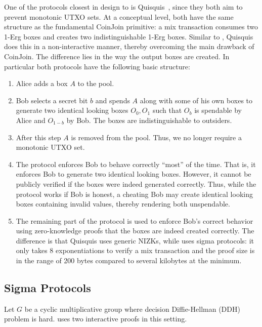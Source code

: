 \documentclass[runningheads]{llncs}
\begin{document}
One of the protocols closest in design to \algname is Quisquis~\cite{quisquis}, since they both aim to prevent monotonic UTXO sets. 
At a conceptual level, both have the same structure as the fundamental CoinJoin primitive: a mix transaction consumes two 1-Erg boxes and creates two indistinguishable
1-Erg boxes. Similar to \algname, Quisquis does this in a non-interactive manner, thereby overcoming the main drawback of CoinJoin. The difference lies in the way 
the output boxes are created. In particular both protocols have the following basic structure:
\begin{enumerate}
    \item Alice adds a box $A$ to the pool.
    \item Bob selects a secret bit $b$ and spends $A$ along with some of his own boxes to generate two identical looking boxes $O_0, O_1$ such that $O_b$ is spendable by Alice and $O_{1-b}$ by Bob. The boxes are indistinguishable to outsiders. 
    \item After this step $A$ is removed from the pool. Thus, we no longer require a monotonic UTXO set. 
    \item The protocol enforces Bob to behave correctly ``most'' of the time. That is, it enforces Bob to generate two identical looking boxes. However, it cannot be publicly verified if the boxes were indeed generated correctly. Thus, while the protocol works if Bob is honest, a cheating Bob may create identical looking boxes containing invalid values, thereby rendering both unspendable. 
    \item The remaining part of the protocol is used to enforce Bob's correct behavior using zero-knowledge proofs that the boxes are indeed created correctly.
    The difference is that Quisquis uses generic NIZKs, while \algname uses sigma protocols: it only takes 8 exponentiations to verify a \algname mix transaction and the proof size  is in the range of 200 bytes compared to several kilobytes at the minimum. 

\end{enumerate}

\subsection{Sigma Protocols} 

Let $G$ be a cyclic multiplicative group where decision Diffie-Hellman (DDH) problem is hard. 
\algname uses two interactive proofs in this setting. 
\end{document}
